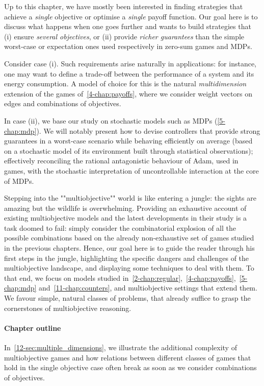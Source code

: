 %


Up to this chapter, we have mostly been interested in finding strategies that achieve a \emph{single} objective or optimise a \emph{single} payoff function. Our goal here is to discuss what happens when one goes further and wants to build strategies that (i) ensure \emph{several objectives}, or (ii) provide \emph{richer guarantees} than the simple worst-case or expectation ones used respectively in zero-sum games and MDPs. 

Consider case (i). Such requirements arise naturally in applications: for instance, one may want to define a trade-off between the performance of a system and its energy consumption. A model of choice for this is the natural \textit{multidimension} extension of the games of~\cref{4-chap:payoffs}, where we consider weight vectors on edges and combinations of objectives.

In case (ii), we base our study on stochastic models such as MDPs (\cref{5-chap:mdp}). We will notably present how to devise controllers that provide strong guarantees in a worst-case scenario while behaving efficiently on average (based on a stochastic model of its environment built through statistical observations); effectively reconciling the rational antagonistic behaviour of Adam, used in games, with the stochastic interpretation of uncontrollable interaction at the core of MDPs.

Stepping into the ""multiobjective"" world is like entering a jungle: the sights are amazing but the wildlife is overwhelming. Providing an exhaustive account of existing multiobjective models and the latest developments in their study is a task doomed to fail: simply consider the combinatorial explosion of all the possible combinations based on the already non-exhaustive set of games studied in the previous chapters. Hence, our goal here is to guide the reader through his first steps in the jungle, highlighting the specific dangers and challenges of the multiobjective landscape, and displaying some techniques to deal with them. To that end, we focus on models studied in~\cref{2-chap:regular},~\cref{4-chap:payoffs},~\cref{5-chap:mdp} and~\cref{11-chap:counters}, and multiobjective settings that extend them. We favour simple, natural classes of problems, that already suffice to grasp the cornerstones of multiobjective reasoning. 

\paragraph{Chapter outline} In~\cref{12-sec:multiple_dimensions}, we illustrate the additional complexity of multiobjective games and how relations between different classes of games that hold in the single objective case often break as soon as we consider combinations of objectives. 

